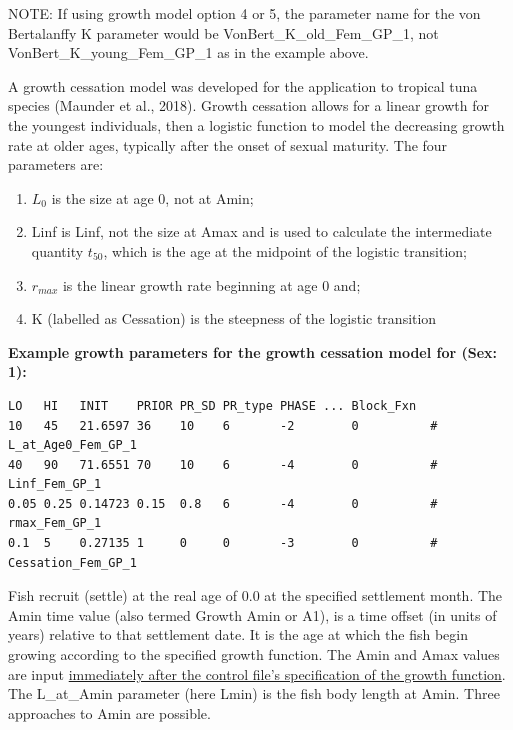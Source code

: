 NOTE: If using growth model option 4 or 5, the parameter name for the von Bertalanffy K parameter would be VonBert\_K\_old\_Fem\_GP\_1, not VonBert\_K\_young\_Fem\_GP\_1 as in the example above.

\hypertarget{GrowthCessation}{}
A growth cessation model was developed for the application to tropical tuna species (Maunder et al., 2018). Growth cessation allows for a linear growth for the youngest individuals, then a logistic function to model the decreasing growth rate at older ages, typically after the onset of sexual maturity. The four parameters are:

\begin{enumerate}
	\item $L_0$ is the size at age 0, not at Amin;
	\item Linf is Linf, not the size at Amax and is used to calculate the intermediate quantity $t_{50}$, which is the age at the midpoint of the logistic transition;
	\item $r_{max}$ is the linear growth rate beginning at age 0 and;
	\item K (labelled as Cessation) is the steepness of the logistic transition
\end{enumerate}

\textbf{Example growth parameters for the growth cessation model for (Sex: 1):}

\begin{verbatim}
LO   HI   INIT    PRIOR PR_SD PR_type PHASE ... Block_Fxn  
10   45   21.6597 36    10    6       -2        0          # L_at_Age0_Fem_GP_1
40   90   71.6551 70    10    6       -4        0          # Linf_Fem_GP_1
0.05 0.25 0.14723 0.15  0.8   6       -4        0          # rmax_Fem_GP_1
0.1  5    0.27135 1     0     0       -3        0          # Cessation_Fem_GP_1
\end{verbatim}


\hypertarget{AminAmax}{}

\hypertarget{GrowthSettlementTiming}{}
Fish recruit (settle) at the real age of 0.0 at the specified settlement month. The Amin time value (also termed Growth Amin or A1), is a time offset (in units of years) relative to that settlement date. It is the age at which the fish begin growing according to the specified growth function. The Amin and Amax values are input \hyperlink{Amin}{immediately after the control file's specification of the growth function}. The L\_at\_Amin parameter (here Lmin) is the fish body length at Amin. Three approaches to Amin are possible.

